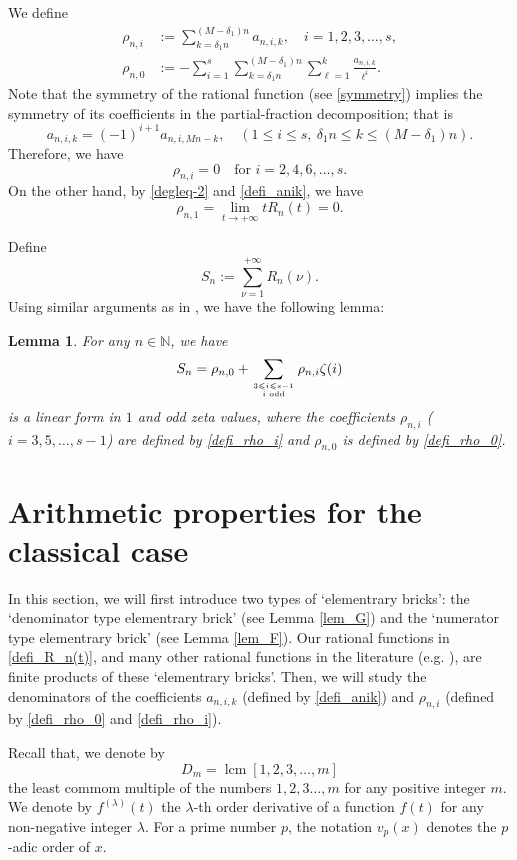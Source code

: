 \documentclass[12pt]{article}
\newtheorem{lemma}[theorem]{Lemma}
\numberwithin{equation}{section}
\begin{document}
We define
\begin{align}
	\rho_{n,i} &:= \sum_{k=\delta_1n}^{(M-\delta_1)n} a_{n,i,k}, \quad i=1,2,3,\ldots,s, \label{defi_rho_i} \\
	\rho_{n,0} &:= -\sum_{i=1}^{s}\sum_{k=\delta_1n}^{(M-\delta_1)n}\sum_{\ell=1}^{k} \frac{a_{n,i,k}}{\ell^i}. \label{defi_rho_0}
\end{align}
Note that the symmetry of the rational function (see \eqref{symmetry}) implies the symmetry of its coefficients in the partial-fraction decomposition; that is
\[ a_{n,i,k} = (-1)^{i+1} a_{n,i,Mn-k}, \quad (1 \leqslant i \leqslant s,~\delta_1n \leqslant k \leqslant (M-\delta_1)n).  \]
Therefore, we have 
\[ \rho_{n,i} = 0 \quad\text{for~} i=2,4,6,\ldots,s.\] 
On the other hand, by \eqref{degleq-2} and \eqref{defi_anik}, we have
\[ \rho_{n,1} = \lim_{t \to +\infty} tR_n(t) = 0. \]

Define 
\begin{equation}\label{defi_Sn}
	 S_n := \sum_{\nu=1}^{+\infty} R_n(\nu). 
\end{equation}
Using similar arguments as in \cite[Lemme 1]{BR2001}, we have the following lemma:
\begin{lemma}\label{lem_linearforms}
For any $n \in \mathbb{N}$, we have
\[ S_n = \rho_{n,0} + \sum_{3 \leqslant i \leqslant s-1 \atop i \text{~odd}} \rho_{n,i} \zeta(i) \]
is a linear form in $1$ and odd zeta values, where the coefficients $\rho_{n,i}$ ($i=3,5,\ldots,s-1$) are defined by \eqref{defi_rho_i} and $\rho_{n,0}$ is defined by \eqref{defi_rho_0}.
\end{lemma}



\section{Arithmetic properties for the classical case}\label{Sect_arit}
In this section, we will first introduce two types of `elementrary bricks': the `denominator type elementrary brick' (see Lemma \ref{lem_G}) and the `numerator type elementrary brick' (see Lemma \ref{lem_F}). Our rational functions in \eqref{defi_R_n(t)}, and many other rational functions in the literature (e.g. \cite{Riv2000,Zud2001}), are finite products of these `elementrary bricks'. Then, we will study the denominators of the coefficients $a_{n,i,k}$ (defined by \eqref{defi_anik}) and $\rho_{n,i}$ (defined by \eqref{defi_rho_0} and \eqref{defi_rho_i}).

Recall that, we denote by
\[ D_m = \operatorname{lcm}[1,2,3,\ldots,m] \]
the least commom multiple of the numbers $1,2,3\ldots,m$ for any positive integer $m$. We denote by $f^{(\lambda)}(t)$ the $\lambda$-th order derivative of a function $f(t)$ for any non-negative integer $\lambda$. For a prime number $p$, the notation $v_p(x)$ denotes the $p$-adic order of $x$. 
\end{document}
